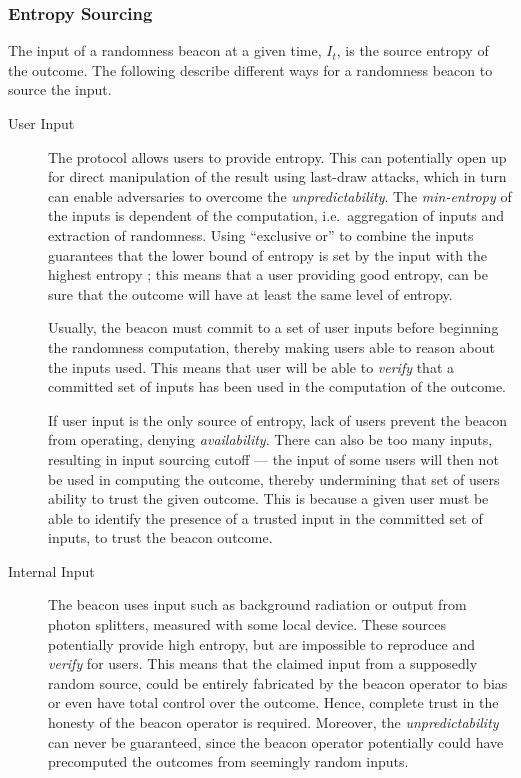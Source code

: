 \subsubsection{Entropy Sourcing}
The input of a randomness beacon at a given time, $I_t$, is the source entropy of the outcome.
The following describe different ways for a randomness beacon to source the input.
\begin{description}
    \item[User Input]
        The protocol allows users to provide entropy.
        This can potentially open up for direct manipulation of the result using last-draw attacks, which in turn can enable adversaries to overcome the \emph{unpredictability}.
        The \emph{min-entropy} of the inputs is dependent of the computation, i.e.\ aggregation of inputs and extraction of randomness.
        Using \enquote{exclusive or} to combine the inputs guarantees that the lower bound of entropy is set by the input with the highest entropy ;
        this means that a user providing good entropy, can be sure that the outcome will have at least the same level of entropy.

        Usually, the beacon must commit to a set of user inputs before beginning the randomness computation, thereby making users able to reason about the inputs used.
        This means that user will be able to \emph{verify} that a committed set of inputs has been used in the computation of the outcome.

        If user input is the only source of entropy, lack of users prevent the beacon from operating, denying \emph{availability}.
        There can also be too many inputs, resulting in input sourcing cutoff ---
        the input of some users will then not be used in computing the outcome, thereby undermining that set of users ability to trust the given outcome.
        This is because a given user must be able to identify the presence of a trusted input in the committed set of inputs, to trust the beacon outcome.

    \item[Internal Input]
        The beacon uses input such as background radiation or output from photon splitters, measured with some local device.
        These sources potentially provide high entropy, but are impossible to reproduce and \emph{verify} for users.
        This means that the claimed input from a supposedly random source, could be entirely fabricated by the beacon operator to bias or even have total control over the outcome.
        Hence, complete trust in the honesty of the beacon operator is required.
        Moreover, the \emph{unpredictability} can never be guaranteed, since the beacon operator potentially could have precomputed the outcomes from seemingly random inputs.


\end{description}
